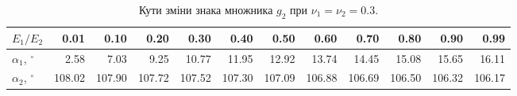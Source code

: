\begin{table}[htbp]
  \centering
  \caption{Кути зміни знака множника $g_2$ при $\nu_1=\nu_2=0.3$.}
  \label{tab:g2-transition-angles}
  \scriptsize
  \setlength{\tabcolsep}{2.6pt}
  \begin{tabular}{@{}lrrrrrrrrrrr@{}}
    \toprule
    $E_1/E_2$ & 0.01 & 0.10 & 0.20 & 0.30 & 0.40 & 0.50 & 0.60 & 0.70 & 0.80 & 0.90 & 0.99 \\
    \midrule
    $\alpha_1$, $^\circ$ & 2.58 & 7.03 & 9.25 & 10.77 & 11.95 & 12.92 & 13.74 & 14.45 & 15.08 & 15.65 & 16.11 \\
    $\alpha_2$, $^\circ$ & 108.02 & 107.90 & 107.72 & 107.52 & 107.30 & 107.09 & 106.88 & 106.69 & 106.50 & 106.32 & 106.17 \\
    \bottomrule
  \end{tabular}
\end{table}

